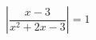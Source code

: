\begin{ex}[type=equation]
	\begin{condition}
		$\left| \dfrac{x - 3}{x^2 + 2x - 3}\right| = 1$
	\end{condition}
\end{ex}